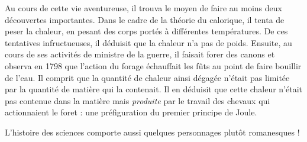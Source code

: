 	Au cours de cette vie aventureuse, il trouva le moyen de faire au moins deux découvertes importantes. Dans le cadre de la théorie du calorique, il tenta de peser la chaleur, en pesant des corps portés à différentes températures. De ces tentatives infructueuses, il déduisit que la chaleur n'a pas de poids. Ensuite, au cours de ses activités de ministre de la guerre, il faisait forer des canons et observa en 1798 que l'action du forage échauffait les fûts au point de faire bouillir de l'eau. Il comprit que la quantité de chaleur ainsi dégagée n'était pas limitée par la quantité de matière qui la contenait. Il en déduisit que cette chaleur n'était pas contenue dans la matière mais \emph{produite} par le travail des chevaux qui actionnaient le foret : une préfiguration du premier principe de Joule.

	L'histoire des sciences comporte aussi quelques personnages plutôt romanesques !

	

\atendofhistorysection
